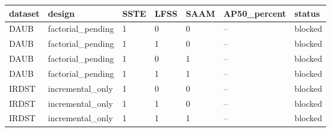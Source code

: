 \begin{tabular}{lllllll}
\hline
dataset & design & SSTE & LFSS & SAAM & AP50\_percent & status \\
\hline
DAUB & factorial\_pending & 1 & 0 & 0 & -- & blocked \\
DAUB & factorial\_pending & 1 & 1 & 0 & -- & blocked \\
DAUB & factorial\_pending & 1 & 0 & 1 & -- & blocked \\
DAUB & factorial\_pending & 1 & 1 & 1 & -- & blocked \\
IRDST & incremental\_only & 1 & 0 & 0 & -- & blocked \\
IRDST & incremental\_only & 1 & 1 & 0 & -- & blocked \\
IRDST & incremental\_only & 1 & 1 & 1 & -- & blocked \\
\hline
\end{tabular}
